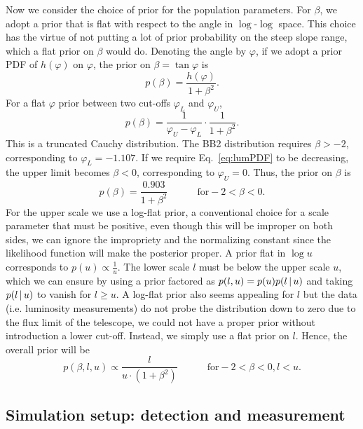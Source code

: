 Now we consider the choice of prior for the population parameters.
For $\beta$, we adopt a prior that is flat with respect to the angle in $\log$-$\log$ space.
This choice has the virtue of not putting a lot of prior probability on the steep slope range, which a flat prior on $\beta$ would do.
Denoting the angle by $\varphi$, if we adopt a prior PDF of $h(\varphi)$ on $\varphi$, the prior on $\beta = \tan\varphi$ is
\begin{equation}
	p(\beta) = \frac{h(\varphi)}{1 + \beta^2}.
\end{equation}
For a flat $\varphi$ prior between two cut-offs $\varphi_L$ and $\varphi_U$,
\begin{equation}
	p(\beta) = \frac{1}{\varphi_U - \varphi_L} \cdot \frac{1}{1 + \beta^2}.
\end{equation}
This is a truncated Cauchy distribution.
The BB2 distribution requires $\beta > -2$, corresponding to $\varphi_L = -1.107$.
If we require Eq.~\ref{eq:lumPDF} to be decreasing, the upper limit becomes $\beta < 0$, corresponding to $\varphi_U = 0$.
Thus, the prior on $\beta$ is
\begin{equation}
p(\beta) = \frac{0.903}{1 + \beta^2} \quad \quad \quad \textrm{for} -2 < \beta < 0.
\end{equation}
For the upper scale we use a log-flat prior, a conventional choice for a scale parameter that must be positive, even though this will be improper on both sides, we can ignore the impropriety and the normalizing constant since the likelihood function will make the posterior proper.
A prior flat in $\log{u}$ corresponds to $p(u) \propto \frac{1}{u}$.
The lower scale $l$ must be below the upper scale $u$, which we can ensure by using a prior factored as $p(l, u) = p(u) p(l \,|\, u)$ and taking $p(l \,|\, u)$ to vanish for $l \geq u$.
A log-flat prior also seems appealing for $l$ but the data (i.e. luminosity measurements) do not probe the distribution down to zero due to the flux limit of the telescope, we could not have a proper prior without introduction a lower cut-off.
Instead, we simply use a flat prior on $l$.
Hence, the overall prior will be \begin{equation}\label{eq:popParsPriorPDF} p(\beta, l, u) \propto \frac{l}{u \cdot (1 + \beta^2)} \quad\quad\quad \textrm{for} -2 < \beta < 0, l < u.
\end{equation}

\subsection{Simulation setup: detection and measurement}
\label{sec:simsetup-data}


